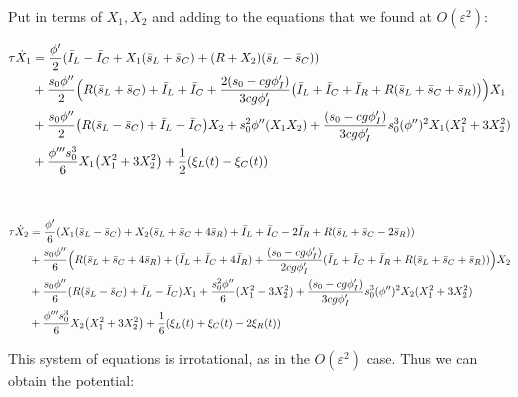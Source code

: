 \documentclass[ENG]{fancynotes}
\begin{document}
Put in terms of $X_1, X_2$ and adding to the equations that we found at $O(\varepsilon^2)$:

\begin{equation}
\begin{aligned}
\tau \dot{X}_1 &= \frac{\phi'}{2}(\bar{I}_L -  \bar{I}_C + X_1(\bar{s}_L+ \bar{s}_C)+(R+X_2) (\bar{s}_L - \bar{s}_C)) \\
&+ \frac{s_0\phi''}{2}\Bigl(R(\bar{s}_L+\bar{s}_C) +\bar{I}_L + \bar{I}_C + \frac{2(s_0-cg\phi'_I)}{3cg\phi'_I}\bigl(\bar{I}_L+\bar{I}_C+\bar{I}_R + R(\bar{s}_L+ \bar{s}_C+ \bar{s}_R)\bigl) \Bigr)X_1\\
&+ \frac{s_0\phi''}{2}\bigl(R(\bar{s}_L-\bar{s}_C) + \bar{I}_L - \bar{I}_C\bigr)X_2+ s_0^2\phi''(X_1X_2)+ \frac{(s_0-cg\phi'_I)}{3cg\phi'_I} s_0^3 (\phi'')^2 X_1(X_1^2+3X_2^2)\\
& + \frac{\phi'''s_0^3}{6}  X_1\bigl(X_1^2+3X_2^2\bigr) + \frac{1}{2}(\xi_L(t)-\xi_C(t)) \\[8pt]
&\end{aligned}
\end{equation}

\begin{equation}
\begin{aligned}
\tau \dot{X}_2 &= \frac{\phi'}{6}(X_1(\bar{s}_L- \bar{s}_C)+X_2(\bar{s}_L +\bar{s}_C+4\bar{s}_R)+\bar{I}_L +  \bar{I}_C - 2 \bar{I}_R +  R (\bar{s}_L+ \bar{s}_C -2\bar{s}_R) )\\
& + \frac{s_0\phi''}{6}\Bigl( R(\bar{s}_L+\bar{s}_C+ 4\bar{s}_R) + (\bar{I}_L + \bar{I}_C + 4\bar{I}_R) + \frac{(s_0-cg\phi'_I)}{2cg\phi'_I}(\bar{I}_L+\bar{I}_C+\bar{I}_R + R(\bar{s}_L+ \bar{s}_C+ \bar{s}_R)) \Bigr)X_2\\
& + \frac{s_0\phi''}{6}(R(\bar{s}_L-\bar{s}_C) + \bar{I}_L - \bar{I}_C) X_1 + \frac{s_0^2\phi''}{6}(X_1^2-3X_2^2) +  \frac{(s_0-cg\phi'_I)}{3cg\phi'_I}s_0^3(\phi'')^2 X_2(X_1^2+3X_2^2) \\
&+ \frac{\phi'''s_0^3}{6} X_2\bigl(X_1^2+3X_2^2\bigr)  + \frac{1}{6}(\xi_L(t)+\xi_C(t)-2\xi_R(t))\\
\end{aligned}
\end{equation}

This system of equations is irrotational, as in the $O(\varepsilon^2)$ case. Thus we can obtain the potential:

\[
\]
\end{document}
